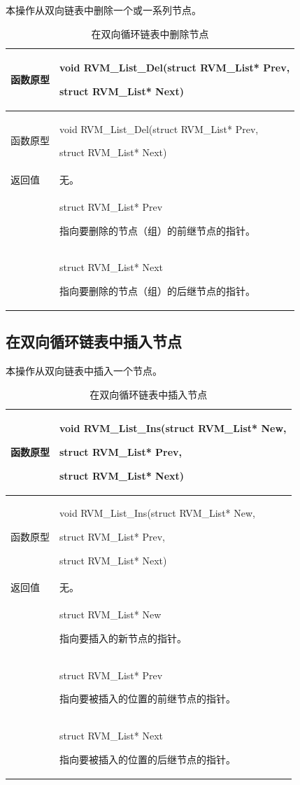 本操作从双向链表中删除一个或一系列节点。

\begin{xltabular}{\textwidth}{@{}>{\hsize\raggedright\arraybackslash}X>{\hsize\raggedright\arraybackslash}X@{}}
\caption{在双向循环链表中删除节点}\label{tab:3-16}\\
\toprule
函数原型\strut
 & void RVM\_\allowbreak{}List\_\allowbreak{}Del(struct RVM\_\allowbreak{}List* Prev,

struct RVM\_\allowbreak{}List* Next)\strut
\tabularnewline
\endfirsthead
\toprule
函数原型\strut
 & void RVM\_\allowbreak{}List\_\allowbreak{}Del(struct RVM\_\allowbreak{}List* Prev,

struct RVM\_\allowbreak{}List* Next)\strut
\tabularnewline
\midrule
\endhead
\bottomrule
\endlastfoot
返回值 & 无。\tabularnewline
{} & struct RVM\_\allowbreak{}List* Prev

指向要删除的节点（组）的前继节点的指针。\strut
\tabularnewline
\strut
 & struct RVM\_\allowbreak{}List* Next

指向要删除的节点（组）的后继节点的指针。\strut
\tabularnewline
\end{xltabular}

\subsection{在双向循环链表中插入节点}\label{subsec:3-6-4}

本操作从双向链表中插入一个节点。

\begin{xltabular}{\textwidth}{@{}>{\hsize\raggedright\arraybackslash}X>{\hsize\raggedright\arraybackslash}X@{}}
\caption{在双向循环链表中插入节点}\label{tab:3-17}\\
\toprule
函数原型\strut
 & void RVM\_\allowbreak{}List\_\allowbreak{}Ins(struct RVM\_\allowbreak{}List* New,

struct RVM\_\allowbreak{}List* Prev,

struct RVM\_\allowbreak{}List* Next)\strut
\tabularnewline
\endfirsthead
\toprule
函数原型\strut
 & void RVM\_\allowbreak{}List\_\allowbreak{}Ins(struct RVM\_\allowbreak{}List* New,

struct RVM\_\allowbreak{}List* Prev,

struct RVM\_\allowbreak{}List* Next)\strut
\tabularnewline
\midrule
\endhead
\bottomrule
\endlastfoot
返回值 & 无。\tabularnewline
{} & struct RVM\_\allowbreak{}List* New

指向要插入的新节点的指针。\strut
\tabularnewline
\strut
 & struct RVM\_\allowbreak{}List* Prev

指向要被插入的位置的前继节点的指针。\strut
\tabularnewline
\strut
 & struct RVM\_\allowbreak{}List* Next

指向要被插入的位置的后继节点的指针。\strut
\tabularnewline
\end{xltabular}

